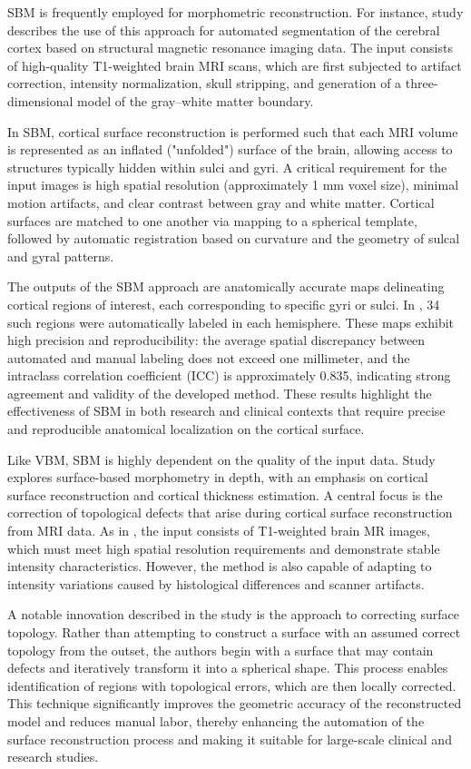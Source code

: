 \documentclass[default]{subfiles}
\begin{document}
SBM is frequently employed for morphometric reconstruction. For instance, study \cite{desikan_2006} describes the use
of this approach for automated segmentation of the cerebral cortex based on structural magnetic resonance imaging data.
The input consists of high-quality T1-weighted brain MRI scans, which are first subjected to artifact correction,
intensity normalization, skull stripping, and generation of a three-dimensional model of the gray–white matter
boundary.

In SBM, cortical surface reconstruction is performed such that each MRI volume is represented as an inflated
("unfolded") surface of the brain, allowing access to structures typically hidden within sulci and gyri. A critical
requirement for the input images is high spatial resolution (approximately 1 mm voxel size), minimal motion artifacts,
and clear contrast between gray and white matter. Cortical surfaces are matched to one another via mapping to a
spherical template, followed by automatic registration based on curvature and the geometry of sulcal and gyral
patterns.

The outputs of the SBM approach are anatomically accurate maps delineating cortical regions of interest, each
corresponding to specific gyri or sulci. In \cite{desikan_2006}, 34 such regions were automatically labeled in each
hemisphere. These maps exhibit high precision and reproducibility: the average spatial discrepancy between automated
and manual labeling does not exceed one millimeter, and the intraclass correlation coefficient (ICC) is approximately
0.835, indicating strong agreement and validity of the developed method. These results highlight the effectiveness of
SBM in both research and clinical contexts that require precise and reproducible anatomical localization on the
cortical surface.

Like VBM, SBM is highly dependent on the quality of the input data. Study \cite{fischl_2012} explores surface-based
morphometry in depth, with an emphasis on cortical surface reconstruction and cortical thickness estimation. A central
focus is the correction of topological defects that arise during cortical surface reconstruction from MRI data. As in
\cite{desikan_2006}, the input consists of T1-weighted brain MR images, which must meet high spatial resolution
requirements and demonstrate stable intensity characteristics. However, the method is also capable of adapting to
intensity variations caused by histological differences and scanner artifacts.

A notable innovation described in the study is the approach to correcting surface topology. Rather than attempting to
construct a surface with an assumed correct topology from the outset, the authors begin with a surface that may contain
defects and iteratively transform it into a spherical shape. This process enables identification of regions with
topological errors, which are then locally corrected. This technique significantly improves the geometric accuracy of
the reconstructed model and reduces manual labor, thereby enhancing the automation of the surface reconstruction
process and making it suitable for large-scale clinical and research studies.
\end{document}
